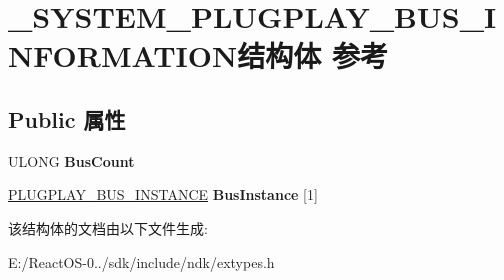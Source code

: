 \hypertarget{struct___s_y_s_t_e_m___p_l_u_g_p_l_a_y___b_u_s___i_n_f_o_r_m_a_t_i_o_n}{}\section{\+\_\+\+S\+Y\+S\+T\+E\+M\+\_\+\+P\+L\+U\+G\+P\+L\+A\+Y\+\_\+\+B\+U\+S\+\_\+\+I\+N\+F\+O\+R\+M\+A\+T\+I\+O\+N结构体 参考}
\label{struct___s_y_s_t_e_m___p_l_u_g_p_l_a_y___b_u_s___i_n_f_o_r_m_a_t_i_o_n}
\subsection*{Public 属性}
\begin{DoxyCompactItemize}
\item 
\mbox{\label{struct___s_y_s_t_e_m___p_l_u_g_p_l_a_y___b_u_s___i_n_f_o_r_m_a_t_i_o_n_aa4455560aaf4d3c627b88cc4b29cc2fa}} 
U\+L\+O\+NG {\bfseries Bus\+Count}
\item 
\mbox{\label{struct___s_y_s_t_e_m___p_l_u_g_p_l_a_y___b_u_s___i_n_f_o_r_m_a_t_i_o_n_a9e7f1d914bcea2c11a49e7777bdec7fc}} 
\hyperlink{struct___p_l_u_g_p_l_a_y___b_u_s___i_n_s_t_a_n_c_e}{P\+L\+U\+G\+P\+L\+A\+Y\+\_\+\+B\+U\+S\+\_\+\+I\+N\+S\+T\+A\+N\+CE} {\bfseries Bus\+Instance} \mbox{[}1\mbox{]}
\end{DoxyCompactItemize}


该结构体的文档由以下文件生成\+:\begin{DoxyCompactItemize}
\item 
E\+:/\+React\+O\+S-\/0../sdk/include/ndk/extypes.\+h\end{DoxyCompactItemize}
